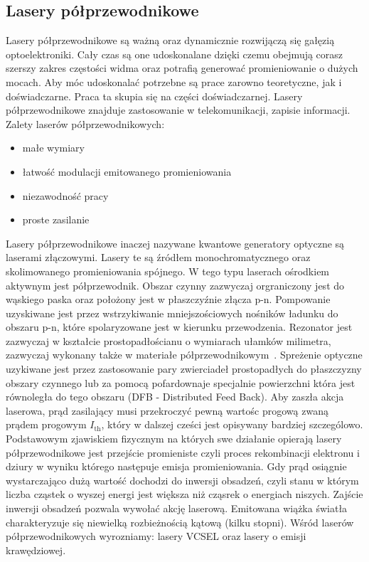 \subsection{Lasery półprzewodnikowe}
Lasery półprzewodnikowe są ważną oraz dynamicznie rozwijączą się gałęzią optoelektroniki. Cały czas są one udoskonalane dzięki
 czemu obejmują corasz szerszy zakres częstości widma oraz potrafią generować promieniowanie o dużych mocach.
 Aby móc udoskonalać  potrzebne są prace zarowno teoretyczne, jak i doświadczarne. Praca ta skupia się na części doświadczarnej.
 Lasery półprzewodnikowe znajduje zastosowanie w telekomunikacji, zapisie informacji.
 Zalety laserów półprzewodnikowych:
 \begin{itemize}
 \item małe wymiary
 \item łatwość modulacji emitowanego promieniowania
 \item niezawodność pracy
 \item proste zasilanie
 \end{itemize}
 \newpage
Lasery półprzewodnikowe inaczej nazywane kwantowe generatory optyczne są laserami złączowymi. Lasery te są źródłem
monochromatycznego oraz skolimowanego promieniowania spójnego. W tego typu laserach ośrodkiem aktywnym jest półprzewodnik.
Obszar czynny zazwyczaj orgraniczony jest do wąskiego paska oraz położony jest w płaszczyźnie złącza p-n.
Pompowanie uzyskiwane jest przez wstrzykiwanie mniejszościowych nośników ładunku do obszaru p-n, które spolaryzowane jest w kierunku przewodzenia.
Rezonator jest zazwyczaj w kształcie prostopadłościanu o wymiarach ułamków milimetra, zazwyczaj wykonany także w materiałe półprzewodnikowym~\cite{publikcja_nakwaski}.
Spreżenie optyczne uzykiwane jest przez zastosowanie pary zwierciadeł prostopadłych do płaszczyzny obszary czynnego lub
za pomocą pofardownaje specjalnie powierzchni która jest równoległa do tego obszaru (DFB - Distributed Feed Back).
Aby zaszła akcja laserowa, prąd zasilający musi przekroczyć pewną wartośc progową zwaną prądem progowym $I_{\mathrm{th}}$, który w dalszej cześci jest
opisywany bardziej szczególowo.
Podstawowym zjawiskiem fizycznym na których swe działanie opierają lasery półprzewodnikowe jest przejście promieniste
czyli proces rekombinacji elektronu i dziury w wyniku którego następuje emisja promieniowania. Gdy prąd osiągnie wystarczająco
dużą wartość dochodzi do inwersji obsadzeń, czyli stanu w którym liczba cząstek o wyszej energi jest większa niż cząsrek o energiach niszych.
Zajście inwersji obsadzeń pozwala wywołać akcję laserową. Emitowana wiążka światła charakteryzuje się niewielką rozbieżnością kątową (kilku stopni). Wśród laserów półprzewodnikowych
wyrozniamy: lasery VCSEL oraz lasery o emisji krawędziowej.
